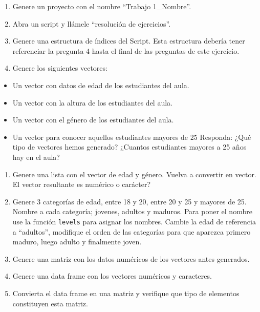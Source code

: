 \documentclass[]{article}
\providecommand{\tightlist}{%
  \setlength{\itemsep}{0pt}\setlength{\parskip}{0pt}}
\begin{document}
\begin{enumerate}
\def\labelenumi{\arabic{enumi}.}
\tightlist
\item
  Genere un proyecto con el nombre ``Trabajo 1\_Nombre''.
\item
  Abra un script y llámele ``resolución de ejercicios''.
\item
  Genere una estructura de índices del Script. Esta estructura debería
  tener referenciar la pregunta 4 hasta el final de las preguntas de
  este ejercicio.
\item
  Genere los siguientes vectores:
\end{enumerate}

\begin{itemize}
\tightlist
\item
  Un vector con datos de edad de los estudiantes del aula.
\item
  Un vector con la altura de los estudiantes del aula.
\item
  Un vector con el género de los estudiantes del aula.
\item
  Un vector para conocer aquellos estudiantes mayores de 25 Responda:
  ¿Qué tipo de vectores hemos generado? ¿Cuantos estudiantes mayores a
  25 años hay en el aula?
\end{itemize}

\begin{enumerate}
\def\labelenumi{\arabic{enumi}.}
\setcounter{enumi}{4}
\tightlist
\item
  Genere una lista con el vector de edad y género. Vuelva a convertir en
  vector. El vector resultante es numérico o carácter?
\item
  Genere 3 categorías de edad, entre 18 y 20, entre 20 y 25 y mayores de
  25. Nombre a cada categoría; jovenes, adultos y maduros. Para poner el
  nombre use la función \texttt{levels} para asignar los nombres. Cambie
  la edad de referencia a ``adultos'', modifique el orden de las
  categorías para que aparezca primero maduro, luego adulto y finalmente
  joven.
\item
  Genere una matriz con los datos numéricos de los vectores antes
  generados.
\item
  Genere una data frame con los vectores numéricos y caracteres.
\item
  Convierta el data frame en una matriz y verifique que tipo de
  elementos constituyen esta matriz.
\end{enumerate}
\end{document}
